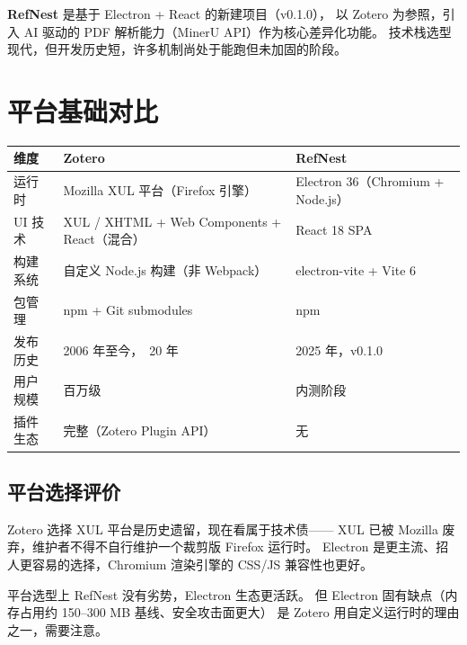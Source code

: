 \documentclass[12pt, a4paper]{article}
\begin{document}
\textbf{RefNest} 是基于 Electron + React 的新建项目（v0.1.0），
以 Zotero 为参照，引入 AI 驱动的 PDF 解析能力（MinerU API）作为核心差异化功能。
技术栈选型现代，但开发历史短，许多机制尚处于能跑但未加固的阶段。

\section{平台基础对比}

\begin{center}
\begin{tabular}{p{3.5cm} p{5cm} p{5cm}}
  \toprule
  \textbf{维度} & \textbf{Zotero} & \textbf{RefNest} \\
  \midrule
  运行时     & Mozilla XUL 平台（Firefox 引擎） & Electron 36（Chromium + Node.js） \\
  UI 技术    & XUL / XHTML + Web Components + React（混合） & React 18 SPA \\
  构建系统   & 自定义 Node.js 构建（非 Webpack） & electron-vite + Vite 6 \\
  包管理     & npm + Git submodules & npm \\
  发布历史   & 2006 年至今，~20 年 & 2025 年，v0.1.0 \\
  用户规模   & 百万级 & 内测阶段 \\
  插件生态   & 完整（Zotero Plugin API） & 无 \\
  \bottomrule
\end{tabular}
\end{center}

\subsection{平台选择评价}

Zotero 选择 XUL 平台是历史遗留，现在看属于技术债——
XUL 已被 Mozilla 废弃，维护者不得不自行维护一个裁剪版 Firefox 运行时。
Electron 是更主流、招人更容易的选择，Chromium 渲染引擎的 CSS/JS 兼容性也更好。

\begin{tcolorbox}[warnbox, title={平台层结论}]
  平台选型上 RefNest 没有劣势，Electron 生态更活跃。
  但 Electron 固有缺点（内存占用约 150--300 MB 基线、安全攻击面更大）
  是 Zotero 用自定义运行时的理由之一，需要注意。
\end{tcolorbox}

\end{document}
